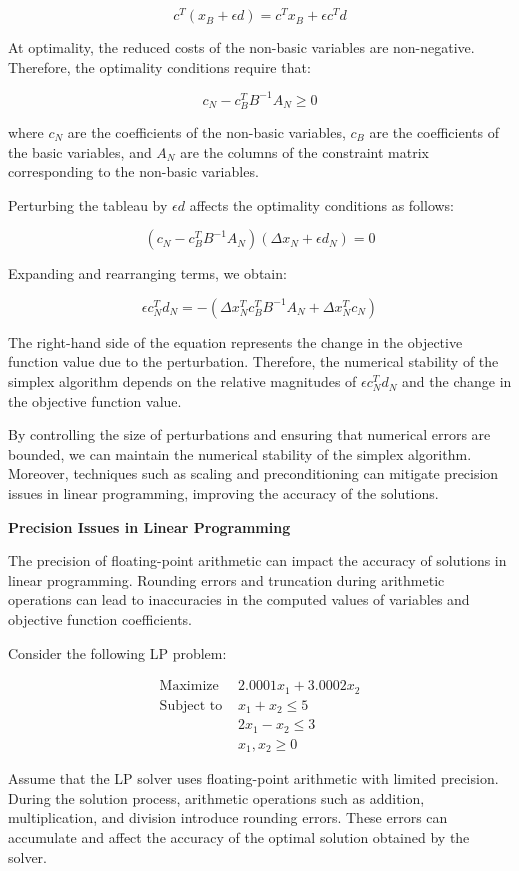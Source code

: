 \documentclass[12pt]{book} %
\begin{document}
\[
c^T(x_B + \epsilon d) = c^Tx_B + \epsilon c^Td
\]

At optimality, the reduced costs of the non-basic variables are non-negative. Therefore, the optimality conditions require that:

\[
c_N - c_B^TB^{-1}A_N \geq 0
\]

where $c_N$ are the coefficients of the non-basic variables, $c_B$ are the coefficients of the basic variables, and $A_N$ are the columns of the constraint matrix corresponding to the non-basic variables.

Perturbing the tableau by $\epsilon d$ affects the optimality conditions as follows:

\[
(c_N - c_B^TB^{-1}A_N)(\Delta x_N + \epsilon d_N) = 0
\]

Expanding and rearranging terms, we obtain:

\[
\epsilon c_N^Td_N = -(\Delta x_N^Tc_B^TB^{-1}A_N + \Delta x_N^Tc_N)
\]

The right-hand side of the equation represents the change in the objective function value due to the perturbation. Therefore, the numerical stability of the simplex algorithm depends on the relative magnitudes of $\epsilon c_N^Td_N$ and the change in the objective function value.

By controlling the size of perturbations and ensuring that numerical errors are bounded, we can maintain the numerical stability of the simplex algorithm. Moreover, techniques such as scaling and preconditioning can mitigate precision issues in linear programming, improving the accuracy of the solutions.

\textbf{Precision Issues in Linear Programming}

The precision of floating-point arithmetic can impact the accuracy of solutions in linear programming. Rounding errors and truncation during arithmetic operations can lead to inaccuracies in the computed values of variables and objective function coefficients.

Consider the following LP problem:


\begin{align*}
\text{Maximize } & 2.0001x_1 + 3.0002x_2 \\
\text{Subject to } & x_1 + x_2 \leq 5 \\
& 2x_1 - x_2 \leq 3 \\
& x_1, x_2 \geq 0
\end{align*}


Assume that the LP solver uses floating-point arithmetic with limited precision. During the solution process, arithmetic operations such as addition, multiplication, and division introduce rounding errors. These errors can accumulate and affect the accuracy of the optimal solution obtained by the solver.
\end{document}
